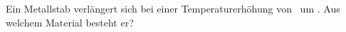 Ein Metallstab verlängert sich bei einer Temperaturerhöhung von \dTaO\ um \dlrO. Aus welchem Material besteht er?
